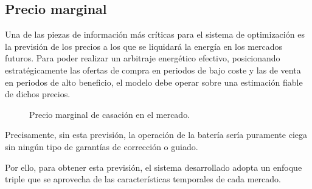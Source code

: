 \subsection{Precio marginal}
\label{makereference4.1.1}

Una de las piezas de información más críticas para el sistema de optimización es la previsión de los precios a los que se liquidará la energía en los mercados futuros. Para poder realizar un arbitraje energético efectivo, posicionando estratégicamente las ofertas de compra en periodos de bajo coste y las de venta en periodos de alto beneficio, el modelo debe operar sobre una estimación fiable de dichos precios.

\begin{figure}
  \centering
  \caption{Precio marginal de casación en el mercado.}
  \label{fig:precio-casación}
\end{figure}

Precisamente, sin esta previsión, la operación de la batería sería puramente ciega sin ningún tipo de garantías de corrección o guiado.

Por ello, para obtener esta previsión, el sistema desarrollado adopta un enfoque triple que se aprovecha de las características temporales de cada mercado.

